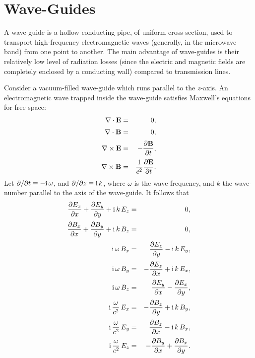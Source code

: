 \section{Wave-Guides}
A wave-guide is a hollow conducting pipe, of uniform cross-section, used to transport high-frequency
electromagnetic waves (generally, in the microwave band) from one
point to another. The main advantage of wave-guides is their relatively
low level of radiation losses (since the electric and
magnetic fields are completely enclosed by a conducting wall) compared to transmission lines.

Consider a vacuum-filled wave-guide which runs parallel to the $z$-axis.
An electromagnetic wave trapped inside the wave-guide satisfies Maxwell's equations for free space:
\begin{eqnarray}
\nabla\cdot{\bf E} &=& 0,\\[0.5ex]
\nabla\cdot{\bf B} &=&0,\\[0.5ex]
\nabla\times{\bf E} &=&-\frac{\partial {\bf B}}{\partial t},\\[0.5ex]
\nabla\times{\bf B} &=& \frac{1}{c^2}\frac{\partial {\bf E}}{\partial t}.
\end{eqnarray}
Let $\partial/\partial t\equiv -{\rm i}\,\omega$, and $\partial/\partial z\equiv
{\rm i}\,k$, where $\omega$ is the wave frequency, and $k$ the wave-number parallel to the axis of the wave-guide. 
It follows that
\begin{eqnarray}\label{e9.210}
\frac{\partial E_x}{\partial x} + \frac{\partial E_y}{\partial y} + {\rm i}\,k\,E_z &=& 0,\\[0.5ex]\label{e9.211}
\frac{\partial B_x}{\partial x} + \frac{\partial B_y}{\partial y} + {\rm i}\,k\,B_z &=& 0,\\[0.5ex]\label{e9.212}
{\rm i}\,\omega\, B_x&=& \frac{\partial E_z}{\partial y} - {\rm i}\,k\,E_y,\\[0.5ex]\label{e9.213}
{\rm i}\,\omega\,B_y &=& -\frac{\partial E_z}{\partial x} + {\rm i}\,k\,E_x,\\[0.5ex]\label{e9.214}
{\rm i}\,\omega\,B_z&=&\frac{\partial E_y}{\partial x} - \frac{\partial E_x}{\partial y},\\[0.5ex]\label{e9.215}
{\rm i}\,\frac{\omega}{c^2}\,E_x &=&
- \frac{\partial B_z}{\partial y} + {\rm i}\,k\,B_y,\\[0.5ex]\label{e9.216}
{\rm i}\,\frac{\omega}{c^2}\,E_y &=& \frac{\partial B_z}{\partial x}
- {\rm i}\,k\,B_x,\\[0.5ex]\label{e9.217}
{\rm i}\,\frac{\omega}{c^2}\,E_z &=& -\frac{\partial B_y}{\partial x}+
\frac{\partial B_x}{\partial y}.
\end{eqnarray}

